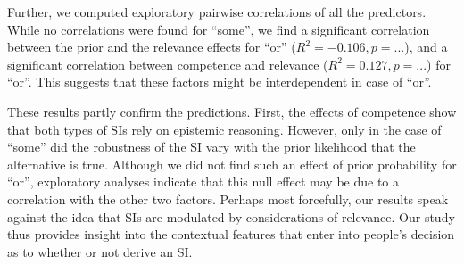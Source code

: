 \documentclass[11pt,letterpaper]{article}
\begin{document}
Further, we computed exploratory pairwise correlations of all the predictors. While no correlations were found for ``some'', we find a significant correlation between the prior and the relevance effects for ``or'' ($R^2 = -0.106, p=...$), and a significant correlation between competence and relevance ($R^2 = 0.127, p=...$) for ``or''. This suggests that these factors might be interdependent in case of ``or''.

These results partly confirm the predictions. First, the effects of competence show that both types
of SIs rely on epistemic reasoning. However, only in the case of “some” did the robustness of
the SI vary with the prior likelihood that the alternative is true. Although we did not find such an
effect of prior probability for “or”, exploratory analyses indicate that this null effect may be due to a
correlation with the other two factors. Perhaps most forcefully, our results speak against the idea
that SIs are modulated by considerations of relevance. Our study thus provides insight into the
contextual features that enter into people’s decision as to whether or not derive an SI.
\newpage

\end{document}
